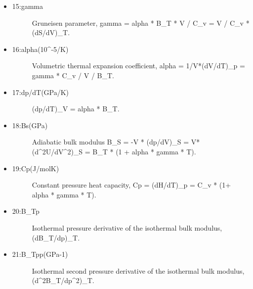\documentclass[a4paper]{article}
\begin{document}
\begin{itemize}
\begin{description}
\end{description}

\item %
\begin{description}
\item[{15:gamma}] \leavevmode 
Gruneisen parameter, gamma = alpha * B\_T * V / C\_v =
V / C\_v * (dS/dV)\_T.

\end{description}

\item %
\begin{description}
\item[{16:alpha(10\textasciicircum{}-5/K)}] \leavevmode 
Volumetric thermal expansion coefficient, alpha = 1/V*(dV/dT)\_p =
gamma * C\_v / V / B\_T.

\end{description}

\item %
\begin{description}
\item[{17:dp/dT(GPa/K)}] \leavevmode 
(dp/dT)\_V = alpha * B\_T.

\end{description}

\item %
\begin{description}
\item[{18:Bs(GPa)}] \leavevmode 
Adiabatic bulk modulus B\_S = -V * (dp/dV)\_S = V*(d\textasciicircum{}2U/dV\textasciicircum{}2)\_S =
B\_T * (1 + alpha * gamma * T).

\end{description}

\item %
\begin{description}
\item[{19:Cp(J/molK)}] \leavevmode 
Constant pressure heat capacity, Cp = (dH/dT)\_p =
C\_v * (1+ alpha * gamma * T).

\end{description}

\item %
\begin{description}
\item[{20:B\_Tp}] \leavevmode 
Isothermal pressure derivative of the isothermal bulk modulus,
(dB\_T/dp)\_T.

\end{description}

\item %
\begin{description}
\item[{21:B\_Tpp(GPa-1)}] \leavevmode 
Isothermal second pressure derivative of the isothermal bulk
modulus, (d\textasciicircum{}2B\_T/dp\textasciicircum{}2)\_T.


\end{description}
\end{itemize}
\end{document}
